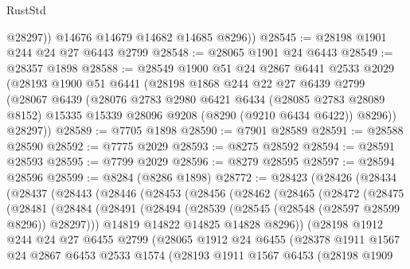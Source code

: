 \begin{lexlean}{RustStd}
\begin{coremodule}
            @28297))
        @14676
        @14679
        @14682
        @14685
        @8296))
@28545 := @28198 @1901 @244 @24 @27 @6443 @2799
@28548 := @28065 @1901 @24 @6443
@28549 := @28357 @1898
@28588 := @28549
    @1900
    @51
    @24
    @2867
    @6441
    @2533
    @2029
    (@28193
      @1900
      @51
      @6441
      (@28198
        @1868
        @244
        @22
        @27
        @6439
        @2799
        (@28067
          @6439
          (@28076
            @2783
            @2980
            @6421
            @6434
            (@28085 @2783 @28089 @8152)
            @15335
            @15339
            @28096
            @9208
            (@8290 (@9210 @6434 @6422))
            @8296))
        @28297))
@28589 := @7705 @1898
@28590 := @7901 @28589
@28591 := @28588 @28590
@28592 := @7775 @2029
@28593 := @8275 @28592
@28594 := @28591 @28593
@28595 := @7799 @2029
@28596 := @8279 @28595
@28597 := @28594 @28596
@28599 := @8284 (@8286 @1898)
@28772 := @28423
    (@28426
      (@28434
        (@28437
          (@28443
            (@28446
              (@28453
                (@28456
                  (@28462
                    (@28465
                      (@28472
                        (@28475
                          (@28481
                            (@28484
                              (@28491
                                (@28494 (@28539 (@28545 (@28548 (@28597 @28599 @8296)) @28297)))
                                @14819
                                @14822
                                @14825
                                @14828
                                @8296))
                            (@28198
                              @1912
                              @244
                              @24
                              @27
                              @6455
                              @2799
                              (@28065
                                @1912
                                @24
                                @6455
                                (@28378
                                  @1911
                                  @1567
                                  @24
                                  @2867
                                  @6453
                                  @2533
                                  @1574
                                  (@28193
                                    @1911
                                    @1567
                                    @6453
                                    (@28198
                                      @1909

\end{coremodule}
\end{lexlean}
